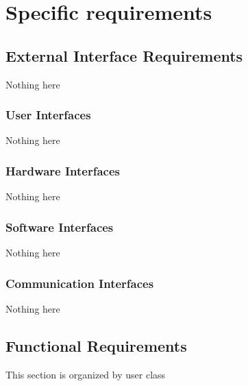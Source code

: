 \section{Specific requirements}

\subsection{External Interface Requirements}
Nothing here

\subsubsection{User Interfaces}
Nothing here

\subsubsection{Hardware Interfaces}
Nothing here

\subsubsection{Software Interfaces}
Nothing here

\subsubsection{Communication Interfaces}
Nothing here


\subsection{Functional Requirements}
This section is organized by user class

